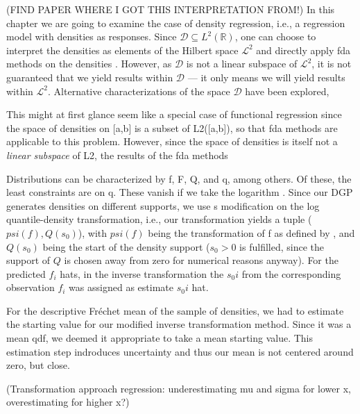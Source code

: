 (FIND PAPER WHERE I GOT THIS INTERPRETATION FROM!)
In this chapter we are going to examine the case of density regression, i.e., a
regression model with densities as responses. Since $\mathcal{D} \subseteq L^2(\mathbb{R})$,
one can choose to interpret the densities as elements of
the Hilbert space $\mathcal{L}^2$ and directly apply fda methods on the densities
\parencite[see e.g.][]{KneipUtikal2001}. However,
as $\mathcal{D}$ is not a linear subspace of $\mathcal{L}^2$, it is not guaranteed that
we yield results within $\mathcal{D}$ --- it only means we will yield results within $\mathcal{L}^2$.
Alternative characterizations of the space $\mathcal{D}$ have been explored,

This might at first glance seem like a
special case of functional regression since the space of densities on [a,b] is a subset
of L2([a,b]), so that fda methods are applicable to this problem. However, since the
space of densities is itself not a \textit{linear subspace} of L2, the results of the
fda methods

Distributions can be characterized by f, F, Q, and q, among others. Of these, the least
constraints are on q. These vanish if we
take the logarithm \parencite[cf.][]{KokoszkaEtAl2019}. Since our DGP generates densities on
different supports, we use \textcite{KokoszkaEtAl2019}s modification on the log quantile-density
transformation, i.e., our transformation yields a tuple ($psi(f), Q(s_0)$), with
$psi(f)$ being the transformation of f as defined by \textcite{PetersenMüller2016}, and
$Q(s_0)$ being the start of the density support ($s_0 > 0$ is fulfilled, since the support
of $Q$ is chosen away from zero for numerical reasons anyway). For the predicted $f_i$ hats,
in the inverse transformation the $s_0i$ from the corresponding observation $f_i$ was
assigned as estimate $s_0i$ hat.

For the descriptive Fréchet mean of the sample of densities, we had to estimate the
starting value for our modified inverse transformation method. Since it was a mean qdf,
we deemed it appropriate to take a mean starting value. This estimation step indroduces
uncertainty and thus our mean is not centered around zero, but close.

(Transformation approach regression: underestimating mu and sigma for lower x,
overestimating for higher x?) \textcite{PetersenLiuDivani2021}

